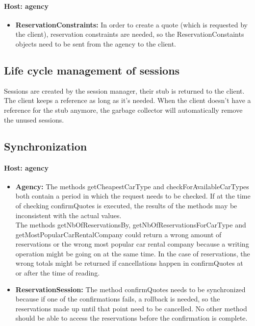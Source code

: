 \documentclass[10pt,a4paper]{article}
\begin{document}
\paragraph{Host: agency}
\begin{itemize}
\item \textbf{ReservationConstraints:} In order to create a quote (which is requested by the client), reservation constraints are needed, so the ReservationConstaints objects need to be sent from the agency to the client. %
\end{itemize}

\subsection{Life cycle management of sessions}
\label{lifecycle}
Sessions are created by the session manager, their stub is returned to the client. The client keeps a reference as long as it's needed. When the client doesn't have a reference for the stub anymore, the garbage collector will automatically remove the unused sessions.

\subsection{Synchronization}


\paragraph{Host: agency}
\begin{itemize}
\item \textbf{Agency:} The methods getCheapestCarType and checkForAvailableCarTypes both contain a period in which the request needs to be checked. If at the time of checking confirmQuotes is executed, the results of the methods may be inconsistent with the actual values.\\ 
The methods getNbOfReservationsBy, getNbOfReservationsForCarType and getMostPopularCarRentalCompany could return a wrong amount of reservations or the wrong most popular car rental company because a writing operation might be going on at the same time. In the case of reservations, the wrong totals might be returned if cancellations happen in confirmQuotes at or after the time of reading.
\item \textbf{ReservationSession:} The method confirmQuotes needs to be synchronized because if one of the confirmations fails, a rollback is needed, so the reservations made up until that point need to be cancelled. No other method should be able to access the reservations before the confirmation is complete.
\end{itemize}
\end{document}
